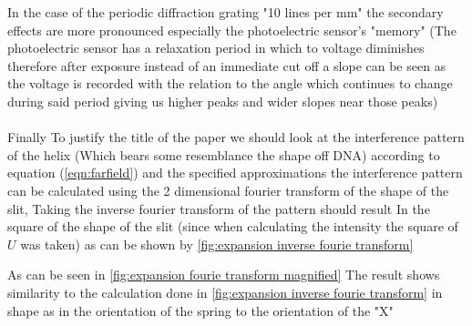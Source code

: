

\newpage
In the case of the periodic diffraction grating "10 lines per mm" the secondary effects are more pronounced especially
the photoelectric sensor's "memory" (The photoelectric sensor has a relaxation period in which to voltage diminishes
therefore after exposure instead of an immediate cut off a slope can be seen as the voltage is recorded with the relation
to the angle which continues to change during said period giving us higher peaks and wider slopes near those peaks)\\
\\
Finally To justify the title of the paper we should look at the interference pattern of the helix (Which bears some resemblance the shape off DNA)
according to equation (\ref{eqn:farfield}) and the specified approximations the interference pattern can be calculated using
the 2 dimensional fourier transform of the shape of the slit, Taking the inverse fourier transform of the pattern should result
In the square of the shape of the slit (since when calculating the intensity the square of $U$ was taken)
as can be shown by \ref{fig:expansion inverse fourie transform}


As can be seen in \ref{fig:expansion fourie transform magnified} The result shows similarity to the calculation done in \ref{fig:expansion inverse fourie transform}
in shape as in the orientation of the spring to the orientation of the "X"